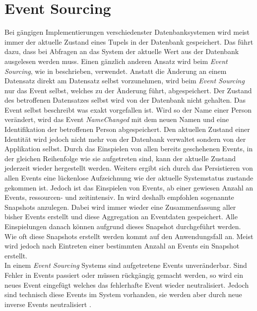 \section{Event Sourcing}
\label{sec:eventSourcing}
Bei gängigen Implementierungen verschiedenster Datenbanksystemen wird meist immer der aktuelle Zustand eines Tupels in der Datenbank gespeichert. Das führt dazu, dass bei Abfragen an das System der aktuelle Wert aus der Datenbank ausgelesen werden muss. Einen gänzlich anderen Ansatz wird beim \textit{Event Sourcing}, wie in \cite{vernon2013implementing} beschrieben, verwendet. Anstatt die Änderung an einem Datensatz direkt am Datensatz selbst vorzunehmen, wird beim \textit{Event Sourcing} nur das Event selbst, welches zu der Änderung führt, abgespeichert. Der Zustand des betroffenen Datensatzes selbst wird von der Datenbank nicht gehalten. Das Event selbst beschreibt was exakt vorgefallen ist. Wird so der Name einer Person verändert, wird das Event \textit{NameChanged} mit dem neuen Namen und eine Identifikation der betroffenen Person abgespeichert. Den aktuellen Zustand einer Identität wird jedoch nicht mehr von der Datenbank verwaltet sondern von der Applikation selbst. Durch das Einspielen von allen bereits geschehenen Events, in der gleichen Reihenfolge wie sie aufgetreten sind, kann der aktuelle Zustand jederzeit wieder hergestellt werden. Weiters ergibt sich durch das Persistieren von allen Events eine lückenlose Aufzeichnung wie der aktuelle Systemstatus zustande gekommen ist. 
Jedoch ist das Einspielen von Events, ab einer gewiesen Anzahl an Events, ressourcen- und zeitintensiv. In \cite{vernon2013implementing} wird deshalb empfohlen sogenannte Snapshots anzulegen. Dabei wird immer wieder eine Zusammenfassung aller bisher Events erstellt und diese Aggregation an Eventdaten gespeichert. Alle Einspielungen danach können aufgrund dieses Snapshot durchgeführt werden. Wie oft diese Snapshots erstellt werden kommt auf den Anwendungsfall an. Meist wird jedoch nach Eintreten einer bestimmten Anzahl an Events ein Snapshot erstellt. \\
In einem \textit{Event Sourcing} Systems sind aufgetretene Events unveränderbar. Sind Fehler in Events passiert oder müssen rückgängig gemacht werden, so wird ein neues Event eingefügt welches das fehlerhafte Event wieder neutralisiert. Jedoch sind technisch diese Events im System vorhanden, sie werden aber durch neue inverse Events neutralisiert \citep{vernon2013implementing}.

